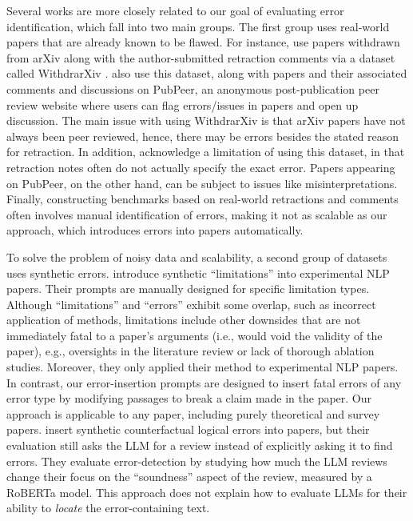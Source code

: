 \documentclass{article}
\begin{document}
Several works are more closely related to our goal of evaluating error identification, which fall into two main groups. The first group uses real-world papers that are already known to be flawed. For instance, \citet{zhang2025} use papers withdrawn from arXiv along with the author-submitted retraction comments via a dataset called WithdrarXiv \citep{rao2024}. \citet{son2025} also use this dataset, along with papers and their associated comments and discussions on PubPeer, an anonymous post-publication peer review website where users can flag errors/issues in papers and open up discussion. The main issue with using WithdrarXiv is that arXiv papers have not always been peer reviewed, hence, there may be errors besides the stated reason for retraction. In addition, \citet{zhang2025} acknowledge a limitation of using this dataset, in that retraction notes often do not actually specify the exact error. Papers appearing on PubPeer, on the other hand, can be subject to issues like misinterpretations. Finally, constructing benchmarks based on real-world retractions and comments often involves manual identification of errors, making it not as scalable as our approach, which introduces errors into papers automatically. 

To solve the problem of noisy data and scalability, a second group of datasets uses synthetic errors. \citet{xu2025llm} introduce synthetic ``limitations'' into experimental NLP papers. Their prompts are manually designed for specific limitation types.  Although ``limitations'' and ``errors'' exhibit some overlap, such as incorrect application of methods, limitations include other downsides that are not immediately fatal to a paper's arguments (i.e., would void the validity of the paper), e.g., oversights in the literature review or lack of thorough ablation studies. Moreover, they only applied their method to experimental NLP papers. In contrast, our error-insertion prompts are designed to insert fatal errors of any error type by modifying passages to break a claim made in the paper. Our approach is applicable to any paper, including purely theoretical and survey papers. \citet{dycke2025} insert synthetic counterfactual logical errors into papers, but their evaluation still asks the LLM for a review instead of explicitly asking it to find errors. They evaluate error-detection by studying how much the LLM reviews change their focus on the ``soundness'' aspect of the review, measured by a RoBERTa model. This approach does not explain how to evaluate LLMs for their ability to \emph{locate} the error-containing text.
\end{document}
